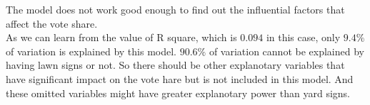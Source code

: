 \documentclass[12pt,letterpaper]{article}
\begin{document}
\begin{enumerate}
	The model does not work good enough to find out the influential factors that affect the vote share.\\
	As we can learn from the value of R square, which is $0.094$ in this case, only $9.4\%$ of variation is explained by this model. $90.6\%$ of variation cannot be explained by having lawn signs or not. So there should be other explanotary variables that have significant impact on the vote hare but is not included in this model. And these omitted variables might have greater explanotary power than yard signs.
	
\end{enumerate}  

\newpage
\end{document}
